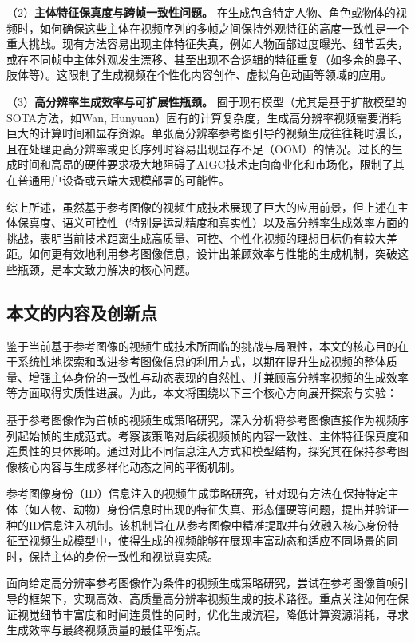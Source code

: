 （2）\textbf{主体特征保真度与跨帧一致性问题。} 在生成包含特定人物、角色或物体的视频时，如何确保这些主体在视频序列的多帧之间保持外观特征的高度一致性是一个重大挑战。现有方法容易出现主体特征失真，例如人物面部过度曝光、细节丢失，或在不同帧中主体外观发生漂移、甚至出现不合逻辑的特征重复（如多余的鼻子、肢体等）。这限制了生成视频在个性化内容创作、虚拟角色动画等领域的应用。

（3）\textbf{高分辨率生成效率与可扩展性瓶颈。} 囿于现有模型（尤其是基于扩散模型的SOTA方法，如Wan\cite{wan2025}, Hunyuan\cite{sun2024hunyuan}）固有的计算复杂度，生成高分辨率视频需要消耗巨大的计算时间和显存资源。单张高分辨率参考图引导的视频生成往往耗时漫长，且在处理更高分辨率或更长序列时容易出现显存不足（OOM）的情况。过长的生成时间和高昂的硬件要求极大地阻碍了AIGC技术走向商业化和市场化，限制了其在普通用户设备或云端大规模部署的可能性。

综上所述，虽然基于参考图像的视频生成技术展现了巨大的应用前景，但上述在主体保真度、语义可控性（特别是运动精度和真实性）以及高分辨率生成效率方面的挑战，表明当前技术距离生成高质量、可控、个性化视频的理想目标仍有较大差距。如何更有效地利用参考图像信息，设计出兼顾效率与性能的生成机制，突破这些瓶颈，是本文致力解决的核心问题。

\subsection{本文的内容及创新点}
鉴于当前基于参考图像的视频生成技术所面临的挑战与局限性，本文的核心目的在于系统性地探索和改进参考图像信息的利用方式，以期在提升生成视频的整体质量、增强主体身份的一致性与动态表现的自然性、并兼顾高分辨率视频的生成效率等方面取得实质性进展。为此，本文将围绕以下三个核心方向展开探索与实验：

基于参考图像作为首帧的视频生成策略研究，深入分析将参考图像直接作为视频序列起始帧的生成范式。考察该策略对后续视频帧的内容一致性、主体特征保真度和连贯性的具体影响。通过对比不同信息注入方式和模型结构，探究其在保持参考图像核心内容与生成多样化动态之间的平衡机制。

参考图像身份（ID）信息注入的视频生成策略研究，针对现有方法在保持特定主体（如人物、动物）身份信息时出现的特征失真、形态僵硬等问题，提出并验证一种的ID信息注入机制。该机制旨在从参考图像中精准提取并有效融入核心身份特征至视频生成模型中，使得生成的视频能够在展现丰富动态和适应不同场景的同时，保持主体的身份一致性和视觉真实感。

面向给定高分辨率参考图像作为条件的视频生成策略研究，尝试在参考图像首帧引导的框架下，实现高效、高质量高分辨率视频生成的技术路径。重点关注如何在保证视觉细节丰富度和时间连贯性的同时，优化生成流程，降低计算资源消耗，寻求生成效率与最终视频质量的最佳平衡点。

